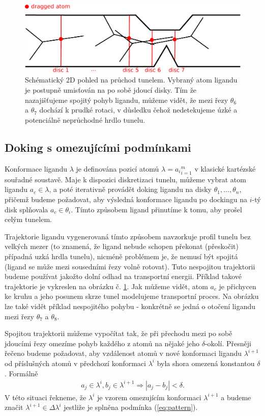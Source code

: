 \begin{figure}[t]
\centering
\includegraphics[width=.8\hsize]{img/tun.pdf}
\caption{Schématický 2D pohled na průchod tunelem. Vybraný atom ligandu je
postupně umisťován na po sobě jdoucí disky. Tím že nazajišťujeme spojitý pohyb
ligandu, můžeme vidět, že mezi řezy $\theta_6$ a $\theta_7$ dochází k prudké rotaci, v
důsledku čehož nedetekujeme úzké a potenciálně neprůchodné hrdlo tunelu.}
\label{fig:lower-bound}
\end{figure}





\subsection{Doking s omezujícími podmínkami}
Konformace ligandu $ \lambda $ je definována pozicí atomů
$ \lambda = {a_i}^m_{i = 1} $ v klasické kartézské souřadné soustavě. Maje
k dispozici diskretizaci tunelu, můžeme vybrat atom ligandu $ a_c \in \lambda $,
a poté iterativně provádět doking ligandu na disky $ \theta_1, \dots, \theta_n $,
přičemž budeme požadovat, aby výsledná konformace ligandu po dockingu na
$ i $-tý disk splňovala $ a_c \in \theta_i $. Tímto způsobem ligand přinutíme
k tomu, aby prošel celým tunelem.

Trajektorie ligandu vygenerovaná tímto způsobem navzorkuje profil tunelu bez
velkých mezer (to znamená, že ligand nebude schopen překonat (přeskočit) případná
uzká hrdla tunelu), nicméně problémem je, že nemusí být spojitá (ligand se
může mezi sousedními řezy volně rotovat). Tuto nespojitou trajektorii budeme
používat jakožto dolní odhad na transportní energii. Příklad takové trajektorie
je vykreslen na obrázku č. \ref{fig:lower-bound}. Jak můžeme vidět, atom $ a_c $
je přichycen ke kruhu a jeho posunem skrze tunel modelujeme transportní
proces. Na obrázku lze také vidět příklad nespojitého pohybu - konkrétně
se jedná o otočení ligandu mezi řezy $ \theta_7$ a $\theta_8$.

Spojitou trajektorii můžeme vypočítat tak, že při přechodu mezi po sobě jdoucími
řezy omezíme pohyb každého z atomů na nějaké jeho $ \delta $-okolí. Přesněji řečeno
budeme požadovat, aby vzdálenost atomů v nové konformaci ligandu $ \lambda^{i + 1} $
od příslušných atomů v předchozí konformaci $ \lambda^{i} $ byla shora omezená
konstantou $ \delta $. Formálně
\begin{align}
    a_j \in \lambda^{i}, b_j \in \lambda^{i + 1} \Rightarrow |a_j - b_j| < \delta.
    \label{eq:pattern}
\end{align}
V této situaci řekneme, že $ \lambda^i $ je vzorem omezujícím konformaci
$ \lambda^{i+1} $ a budeme značit $ \lambda^{i+1} \in \Delta \lambda^i $ jestliže
je splněna podmínka (\ref{eq:pattern}).

